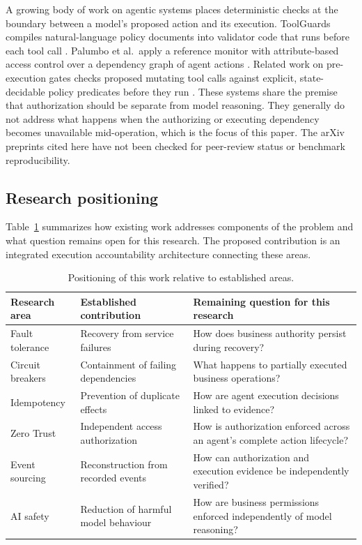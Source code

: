\documentclass[11pt,a4paper]{article}
\begin{document}
A growing body of work on agentic systems places deterministic checks at the boundary between a model's proposed action and its execution. ToolGuards compiles natural-language policy documents into validator code that runs before each tool call \cite{toolguards}. Palumbo et al.\ apply a reference monitor with attribute-based access control over a dependency graph of agent actions \cite{pcas}. Related work on pre-execution gates checks proposed mutating tool calls against explicit, state-decidable policy predicates before they run \cite{reasonless}. These systems share the premise that authorization should be separate from model reasoning. They generally do not address what happens when the authorizing or executing dependency becomes unavailable mid-operation, which is the focus of this paper. The arXiv preprints cited here have not been checked for peer-review status or benchmark reproducibility.

\subsection{Research positioning}

Table~\ref{tab:positioning} summarizes how existing work addresses components of the problem and what question remains open for this research. The proposed contribution is an integrated execution accountability architecture connecting these areas.

\begin{table}[ht]
\centering
\caption{Positioning of this work relative to established areas.}
\label{tab:positioning}
\begin{tabular}{@{}p{3.2cm}p{5.2cm}p{5.6cm}@{}}
\toprule
\textbf{Research area} & \textbf{Established contribution} & \textbf{Remaining question for this research} \\
\midrule
Fault tolerance & Recovery from service failures & How does business authority persist during recovery? \\
Circuit breakers & Containment of failing dependencies & What happens to partially executed business operations? \\
Idempotency & Prevention of duplicate effects & How are agent execution decisions linked to evidence? \\
Zero Trust & Independent access authorization & How is authorization enforced across an agent's complete action lifecycle? \\
Event sourcing & Reconstruction from recorded events & How can authorization and execution evidence be independently verified? \\
AI safety & Reduction of harmful model behaviour & How are business permissions enforced independently of model reasoning? \\
\bottomrule
\end{tabular}
\end{table}
\end{document}

